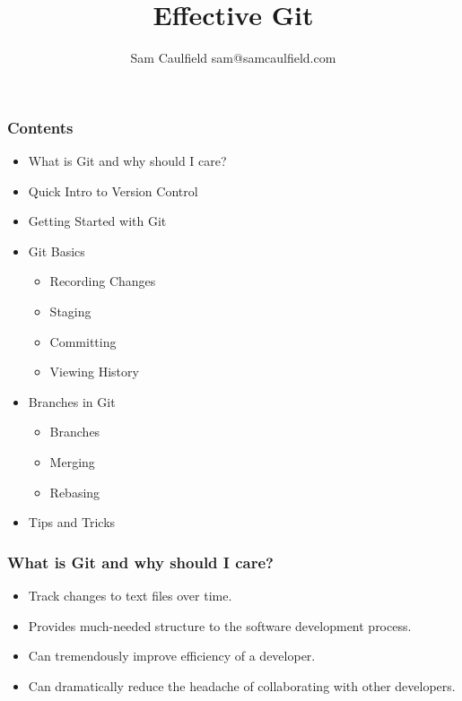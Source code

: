 \documentclass{beamer}
\title{Effective Git}
\author{Sam Caulfield \textlangle{}sam@samcaulfield.com\textrangle{}}
\date{}
\begin{document}
\frame{\titlepage}

\begin{frame}
	\frametitle{Contents}
	\begin{itemize}
		\item{What is Git and why should I care?}
		\item{Quick Intro to Version Control}
		\item{Getting Started with Git}
		\item{Git Basics}
		\begin{itemize}
			\item{Recording Changes}
			\item{Staging}
			\item{Committing}
			\item{Viewing History}
		\end{itemize}
		\item{Branches in Git}
		\begin{itemize}
			\item{Branches}
			\item{Merging}
			\item{Rebasing}
		\end{itemize}
		\item{Tips and Tricks}
	\end{itemize}

\end{frame}


\begin{frame}
	\frametitle{What is Git and why should I care?}
	\begin{itemize}
		\item{Track changes to text files over time.}
		\item{Provides much-needed structure to the software development process.}
		\item{Can tremendously improve efficiency of a developer.}
		\item{Can dramatically reduce the headache of collaborating with other developers.}
	\end{itemize}

\end{frame}
\end{document}
